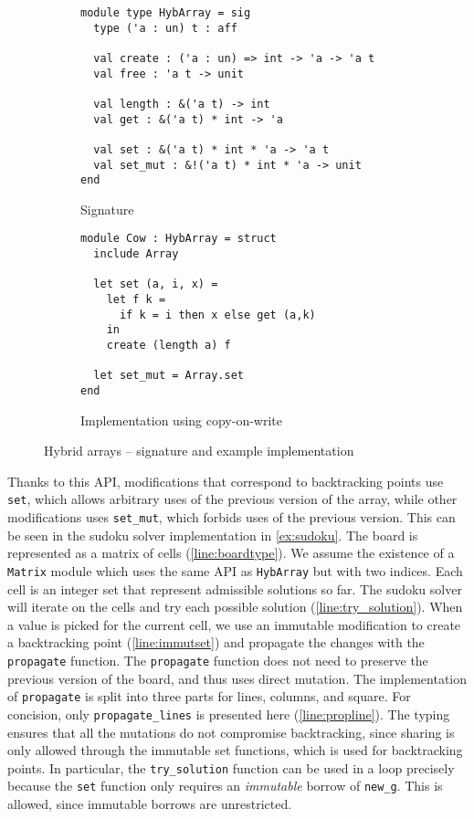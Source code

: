 \begin{figure}
  \centering
  \begin{subfigure}{0.48\linewidth}
\begin{lstlisting}
module type HybArray = sig
  type ('a : un) t : aff
  
  val create : ('a : un) => int -> 'a -> 'a t
  val free : 'a t -> unit

  val length : &('a t) -> int
  val get : &('a t) * int -> 'a

  val set : &('a t) * int * 'a -> 'a t
  val set_mut : &!('a t) * int * 'a -> unit
end
\end{lstlisting}
    \caption{Signature}
    \label{sig:hybarray}
  \end{subfigure}\hfill
  \begin{subfigure}{0.5\linewidth}
\begin{lstlisting}
module Cow : HybArray = struct
  include Array

  let set (a, i, x) =
    let f k =
      if k = i then x else get (a,k)
    in
    create (length a) f
  
  let set_mut = Array.set
end
\end{lstlisting}
    \caption{Implementation using copy-on-write}
    \label{ex:cow}
  \end{subfigure}
  \caption{Hybrid arrays -- signature and example implementation}
\end{figure}



Thanks to this API, modifications that correspond to backtracking points
use \lstinline/set/, which allows arbitrary uses of the previous version
of the array, while other modifications uses \lstinline/set_mut/, which
forbids uses of the previous version.
This can be seen in the sudoku solver implementation in \cref{ex:sudoku}.
The board is represented as a matrix of cells (\cref{line:boardtype}).
We assume the existence of a \lstinline/Matrix/ module which uses the same API
as \lstinline/HybArray/ but with two indices.
Each cell is an integer
set that represent admissible solutions so far. The sudoku solver will
iterate on the cells and try each possible solution (\cref{line:try_solution}).
When a value is picked for the current cell, we use an immutable modification
to create a backtracking point (\cref{line:immutset}) and propagate
the changes with the \lstinline/propagate/ function. The \lstinline/propagate/
function does not need to preserve the previous
version of the board, and thus uses direct mutation.
The implementation of \lstinline/propagate/ is split into three parts
for lines, columns, and square. For concision, only \lstinline/propagate_lines/ is
presented here (\cref{line:propline}).
The typing ensures that all the mutations do not compromise
backtracking, since sharing is only allowed through
the immutable set functions, which is used for backtracking points.
In particular, the \lstinline/try_solution/ function can be used in a loop
precisely because the \lstinline/set/ function only requires an
\emph{immutable} borrow of \lstinline/new_g/.
This is allowed, since immutable borrows are unrestricted.

